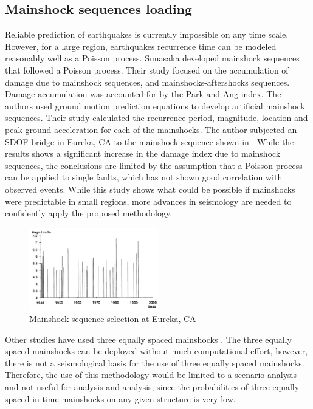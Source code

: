 \subsection{Mainshock sequences loading}

Reliable prediction of earthquakes is currently impossible on any time scale.  However, for a large region, earthquakes recurrence time can be modeled reasonably well as a Poisson process. Sunasaka \cite{Sunasaka1993} developed mainshock sequences that followed a Poisson process. Their study focused on the accumulation of damage due to mainshock sequences, and mainshocks-aftershocks sequences. Damage accumulation was accounted for by the Park and Ang index. The authors used ground motion prediction equations to develop artificial mainshock sequences. Their study calculated the recurrence period, magnitude, location and peak ground acceleration for each of the mainshocks. The author subjected an SDOF bridge in Eureka, CA to the mainshock sequence shown in   . While the results shows a significant increase in the damage index due to mainshock sequences, the conclusions are limited by the assumption that a Poisson process can be applied to single faults, which has not shown good correlation with observed events\cite{Shearer2009}. While this study shows what could be possible if mainshocks were predictable in small regions, more advances in seismology are needed to confidently apply the proposed methodology.

\begin{figure}[htbp]
\centering
\includegraphics[width=0.5\textwidth]{Chapter-2/figs/Mainshock_sequence_01}
\caption{Mainshock sequence selection at Eureka, CA \cite{Sunasaka1993}}
\label{fig:MS-MS_Sunasaka}
\end{figure}

Other studies have used three equally spaced mainshocks \cite{Hatzigeorgiou2009}. The three equally spaced mainshocks can be deployed without much computational effort, however, there is not a seismological basis for the use of three equally spaced mainshocks. Therefore, the use of this methodology would be limited to a scenario analysis and not useful for analysis and analysis, since the probabilities of three equally spaced in time mainshocks on any given structure is very low.

